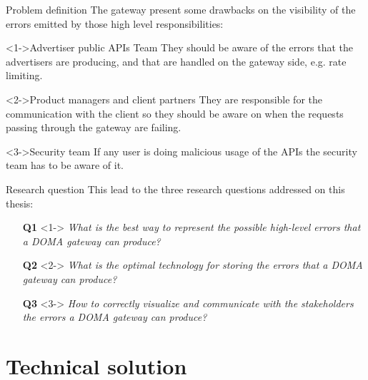 \documentclass[10pt]{beamer}
\begin{document}

\begin{frame}{Problem definition}
    The gateway present some drawbacks on the visibility of the errors emitted by those high level responsibilities:
    \vspace{0.5cm}
    \begin{block}<1->{Advertiser public APIs Team}
        They should be aware of the errors that the advertisers are producing, and that are handled on the gateway side, e.g. rate limiting.
    \end{block}
    
    \begin{block}<2->{Product managers and client partners}
        They are responsible for the communication with the client so they should be aware on when the requests passing through the gateway are failing.
    \end{block}
    
    \begin{block}<3->{Security team}
        If any user is doing malicious usage of the APIs the security team has to be aware of it.
    \end{block}
\end{frame}

\begin{frame}{Research question}
    This lead to the three research questions addressed on this thesis:
    
    \begin{itemize}
    \item[\textbf{Q1}]<1-> \textit{What is the best way to represent the possible high-level errors that a DOMA gateway can produce?}
    \item[\textbf{Q2}]<2-> \textit{What is the optimal technology for storing the errors that a DOMA gateway can produce?}
    \item[\textbf{Q3}]<3-> \textit{How to correctly visualize and communicate with the stakeholders the errors a DOMA gateway can produce?}
\end{itemize}

\end{frame}

\section{Technical solution}
\end{document}
